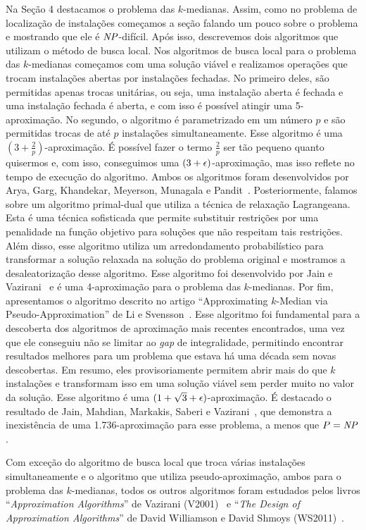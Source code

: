 \documentclass[12pt]{article}
\begin{document}
Na Seção 4 destacamos o problema das $k$-medianas. Assim, como no problema de localização de instalações começamos a seção falando um pouco sobre o problema e mostrando que ele é $\mathit{NP}$-difícil. Após isso, descrevemos dois algoritmos que utilizam o método de busca local. Nos algoritmos de busca local para o problema das $k$-medianas começamos com uma solução viável e realizamos operações que trocam instalações abertas por instalações fechadas. No primeiro deles, são permitidas apenas trocas unitárias, ou seja, uma instalação aberta é fechada e uma instalação fechada é aberta, e com isso é possível atingir uma 5-aproximação. No segundo, o algoritmo é parametrizado em um número $p$ e são permitidas trocas de até $p$ instalações simultaneamente. Esse algoritmo é uma $(3 + \frac{2}{p})$-aproximação. É possível fazer o termo $\frac{2}{p}$ ser tão pequeno quanto quisermos e, com isso, conseguimos uma $(3 + \epsilon)$-aproximação, mas isso reflete no tempo de execução do algoritmo. Ambos os algoritmos foram desenvolvidos por Arya, Garg, Khandekar, Meyerson, Munagala e Pandit~\cite{AryaLocal}. Posteriormente, falamos sobre um algoritmo primal-dual que utiliza a técnica de relaxação Lagrangeana. Esta é uma técnica sofisticada que permite substituir restrições por uma penalidade na função objetivo para soluções que não respeitam tais restrições. Além disso, esse algoritmo utiliza um arredondamento probabilístico para transformar a solução relaxada na solução do problema original e mostramos a desaleatorização desse algoritmo. Esse algoritmo foi desenvolvido por Jain e Vazirani~\cite{JV} e é uma 4-aproximação para o problema das $k$-medianas. Por fim, apresentamos o algoritmo descrito no artigo ``Approximating $k$-Median via Pseudo-Approximation'' de Li e Svensson~\cite{li2012}. Esse algoritmo foi fundamental para a descoberta dos algoritmos de aproximação mais recentes encontrados, uma vez que ele conseguiu não se limitar ao \emph{gap} de integralidade, permitindo encontrar resultados melhores para um problema que estava há uma década sem novas descobertas. Em resumo, eles provisoriamente permitem abrir mais do que $k$ instalações e transformam isso em uma solução viável sem perder muito no valor da solução. Esse algoritmo é uma $(1 + \sqrt{3} + \epsilon)$-aproximação.
É destacado o resultado de Jain, Mahdian, Markakis, Saberi e Vazirani~\cite{jain2002greedy}, que demonstra a inexistência de uma 1.736-aproximação para esse problema, a menos que $P=\mathit{NP}$.

Com exceção do algoritmo de busca local que troca várias instalações simultaneamente e o algoritmo que utiliza pseudo-aproximação, ambos para o problema das $k$-medianas, todos os outros algoritmos foram estudados pelos livros ``\emph{Approximation Algorithms}'' de Vazirani (V2001)~\cite{books/Vazirani} e ``\emph{The Design of Approximation Algorithms}'' de David Williamson e David Shmoys (WS2011)~\cite{books/WS}.
\end{document}
